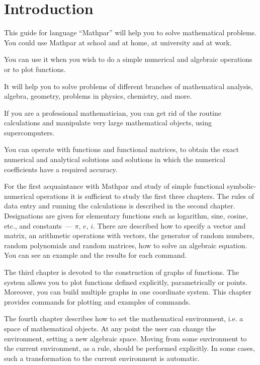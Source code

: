 \chapter{Introduction}
 
This guide for language ``Mathpar'' will help you  to solve mathematical problems.
You could use Mathpar at school and at home, at university and at work. 

You can use it when you wish to do a simple numerical and algebraic operations or to plot functions. 

It will help you to solve problems of different branches of mathematical analysis, algebra, geometry, problems in physics, chemistry, and more.
 
If you are a professional mathematician, you can get rid of the routine calculations and manipulate very large mathematical objects, using supercomputers.   
 
You can operate with functions and functional matrices, to obtain the exact numerical and analytical
solutions and solutions in which the numerical coefficients have a required  accuracy.

For the first acquaintance with Mathpar and study of simple functional symbolic-numerical operations it is sufficient to study  the first three chapters. 
The rules of data entry and running the calculations is described in the second chapter. Designations are given for elementary functions such as logarithm, sine, cosine, etc., and constants~--- $ \pi $, $ e $, $ i $. There are described how to specify a vector and matrix, an arithmetic operations with vectors, the generator of random numbers,   random polynomials and  random  matrices, how to solve an algebraic equation. You can see an example and the results  for each command.

The third chapter is devoted to the construction of graphs of functions. The system allows you to plot functions defined explicitly, parametrically or points. Moreover, you can build multiple graphs in one coordinate system. This chapter provides commands for plotting and examples of commands.

The fourth chapter describes how to set the mathematical environment, i.e. a space
of mathematical objects. At any point the user can change the environment, setting a new algebraic space. Moving from some environment to the current environment, as a rule, should be performed explicitly. In some cases, such a transformation to the current environment is automatic.

